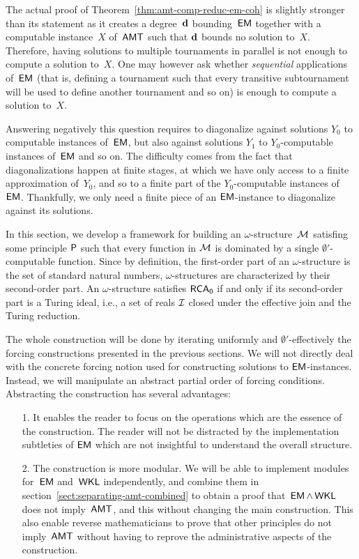 
The actual proof of Theorem~\ref{thm:amt-comp-reduc-em-coh} is slightly stronger than its statement
as it creates a degree~$\mathbf{d}$ bounding~$\operatorname{\sf{EM}}$ together with a computable instance~$X$ of~$\operatorname{\sf{AMT}}$
such that $\mathbf{d}$ bounds no solution to~$X$. Therefore, having solutions to multiple tournaments in parallel
is not enough to compute a solution to~$X$.
One may however ask whether \emph{sequential} applications of~$\operatorname{\sf{EM}}$
(that is, defining a tournament such that every transitive subtournament will be used to define another tournament
and so on) is enough to compute a solution to~$X$.

Answering negatively this question requires to diagonalize against solutions $Y_0$ to computable instances of~$\operatorname{\sf{EM}}$,
but also against solutions $Y_1$ to $Y_0$-computable instances of~$\operatorname{\sf{EM}}$ and so on. The difficulty comes
from the fact that diagonalizations happen at finite stages, at which we have only access to a finite approximation
of~$Y_0$, and so to a finite part of the $Y_0$-computable instances of~$\operatorname{\sf{EM}}$.
Thankfully, we only need a finite piece of an $\operatorname{\sf{EM}}$-instance to diagonalize against its solutions.

In this section, we develop a framework for building an $\omega$-structure~$\mathcal{M}$ satisfing some principle $\mathsf{P}$
such that every function in $\mathcal{M}$ is dominated by a single $\emptyset'$-computable function.
Since by definition, the first-order part of an $\omega$-structure is the set of standard natural numbers,
$\omega$-structures are characterized by their second-order part. An $\omega$-structure
satisfies $\operatorname{\sf{RCA}_0}$ if and only if its second-order part is a Turing ideal, i.e.,
a set of reals $\mathcal{I}$ closed under the effective join and the Turing reduction.

The whole construction will be done by iterating uniformly and $\emptyset'$-effectively
the forcing constructions presented in the previous sections.
We will not directly deal with the concrete forcing notion used for constructing solutions
to $\operatorname{\sf{EM}}$-instances. Instead, we will manipulate an abstract partial order of forcing conditions.
Abstracting the construction has several advantages:
\begin{itemize}
	\item[1.] It enables the reader to focus on the operations which are the essence of the construction.
	The reader will not be distracted by the implementation subtleties of $\operatorname{\sf{EM}}$ which are not insightful 
	to understand the overall structure.
	\item[2.] The construction is more modular. We will be able to implement modules for~$\operatorname{\sf{EM}}$
	and~$\operatorname{\sf{WKL}}$ independently, and combine them in section~\ref{sect:separating-amt-combined} 
	to obtain a proof that~$\operatorname{\sf{EM}} \wedge \allowbreak \operatorname{\sf{WKL}}$ does not imply~$\operatorname{\sf{AMT}}$, 
	and this without changing the main construction.
	This also enable reverse mathematicians to prove that other principles do not imply~$\operatorname{\sf{AMT}}$ without having to reprove
	the administrative aspects of the construction.
\end{itemize}

